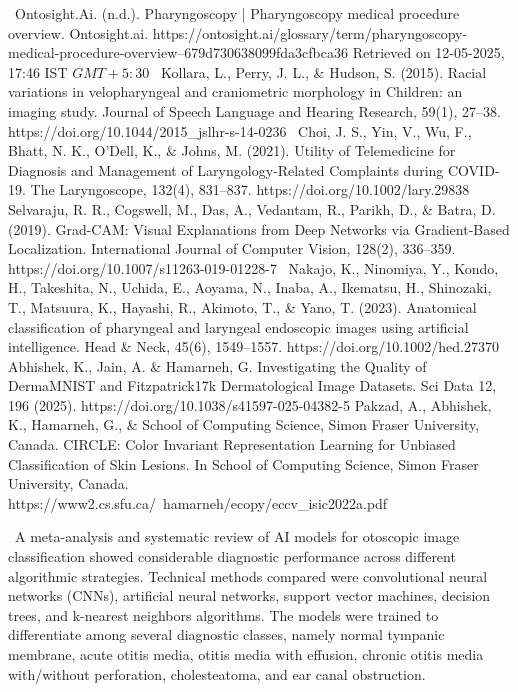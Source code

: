 \begin{thebibliography}{}

~Ontosight.Ai. (n.d.). Pharyngoscopy | Pharyngoscopy medical procedure overview. Ontosight.ai. https://ontosight.ai/glossary/term/pharyngoscopy-medical-procedure-overview--679d730638099fda3cfbca36 Retrieved on 12-05-2025, 17:46 IST \(GMT +5:30\)
~Kollara, L., Perry, J. L., \& Hudson, S. (2015). Racial variations in velopharyngeal and craniometric morphology in Children: an imaging study. Journal of Speech Language and Hearing Research, 59(1), 27–38. https://doi.org/10.1044/2015\_jslhr-s-14-0236
~Choi, J. S., Yin, V., Wu, F., Bhatt, N. K., O’Dell, K., \& Johns, M. (2021). Utility of Telemedicine for Diagnosis and Management of Laryngology‐Related Complaints during COVID‐19. The Laryngoscope, 132(4), 831–837. https://doi.org/10.1002/lary.29838
Selvaraju, R. R., Cogswell, M., Das, A., Vedantam, R., Parikh, D., \& Batra, D. (2019). Grad-CAM: Visual Explanations from Deep Networks via Gradient-Based Localization. International Journal of Computer Vision, 128(2), 336–359. https://doi.org/10.1007/s11263-019-01228-7
~Nakajo, K., Ninomiya, Y., Kondo, H., Takeshita, N., Uchida, E., Aoyama, N., Inaba, A., Ikematsu, H., Shinozaki, T., Matsuura, K., Hayashi, R., Akimoto, T., \& Yano, T. (2023). Anatomical classification of pharyngeal and laryngeal endoscopic images using artificial intelligence. Head \& Neck, 45(6), 1549–1557. https://doi.org/10.1002/hed.27370
Abhishek, K., Jain, A. \& Hamarneh, G. Investigating the Quality of DermaMNIST and Fitzpatrick17k Dermatological Image Datasets. Sci Data 12, 196 (2025). https://doi.org/10.1038/s41597-025-04382-5
Pakzad, A., Abhishek, K., Hamarneh, G., \& School of Computing Science, Simon Fraser University, Canada. CIRCLE: Color Invariant Representation Learning for Unbiased Classification of Skin Lesions. In School of Computing Science, Simon Fraser University, Canada. https://www2.cs.sfu.ca/~hamarneh/ecopy/eccv\_isic2022a.pdf


~A meta-analysis and systematic review of AI models for otoscopic image classification showed considerable diagnostic performance across different algorithmic strategies. Technical methods compared were convolutional neural networks (CNNs), artificial neural networks, support vector machines, decision trees, and k-nearest neighbors algorithms. The models were trained to differentiate among several diagnostic classes, namely normal tympanic membrane, acute otitis media, otitis media with effusion, chronic otitis media with/without perforation, cholesteatoma, and ear canal obstruction.

\end{thebibliography}
